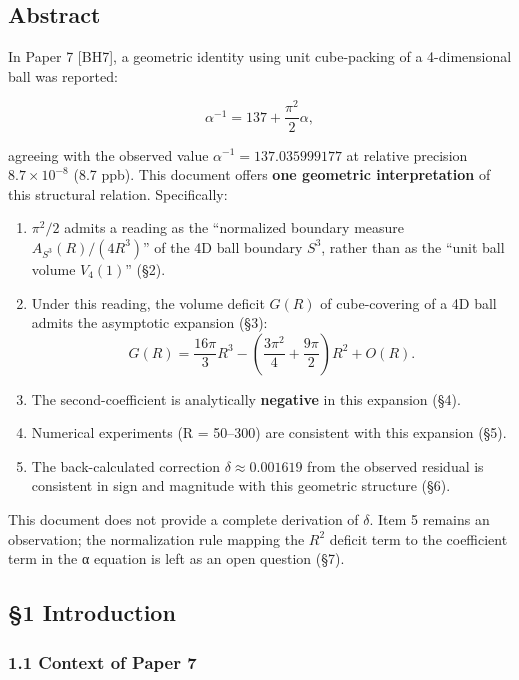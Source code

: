 \documentclass[
]{article}
\providecommand{\tightlist}{%
  \setlength{\itemsep}{0pt}\setlength{\parskip}{0pt}}
\begin{document}
\subsection{Abstract}\label{abstract}

In Paper 7 {[}BH7{]}, a geometric identity using unit cube-packing of a
4-dimensional ball was reported:

\[\alpha^{-1} = 137 + \frac{\pi^2}{2}\alpha,\]

agreeing with the observed value \(\alpha^{-1} = 137.035999177\) at
relative precision \(8.7 \times 10^{-8}\) (8.7 ppb). This document
offers \textbf{one geometric interpretation} of this structural
relation. Specifically:

\begin{enumerate}
\def\labelenumi{\arabic{enumi}.}
\tightlist
\item
  \(\pi^2/2\) admits a reading as the ``normalized boundary measure
  \(A_{S^3}(R)/(4R^3)\)'' of the 4D ball boundary \(S^3\), rather than
  as the ``unit ball volume \(V_4(1)\)'' (§2).
\item
  Under this reading, the volume deficit \(G(R)\) of cube-covering of a
  4D ball admits the asymptotic expansion (§3):
  \[G(R) = \frac{16\pi}{3}R^3 - \left(\frac{3\pi^2}{4} + \frac{9\pi}{2}\right)R^2 + O(R).\]
\item
  The second-coefficient is analytically \textbf{negative} in this
  expansion (§4).
\item
  Numerical experiments (R = 50--300) are consistent with this expansion
  (§5).
\item
  The back-calculated correction \(\delta \approx 0.001619\) from the
  observed residual is consistent in sign and magnitude with this
  geometric structure (§6).
\end{enumerate}

This document does not provide a complete derivation of \(\delta\). Item
5 remains an observation; the normalization rule mapping the \(R^2\)
deficit term to the coefficient term in the α equation is left as an
open question (§7).

\subsection{§1 Introduction}\label{introduction}

\subsubsection{1.1 Context of Paper 7}\label{context-of-paper-7}
\end{document}
